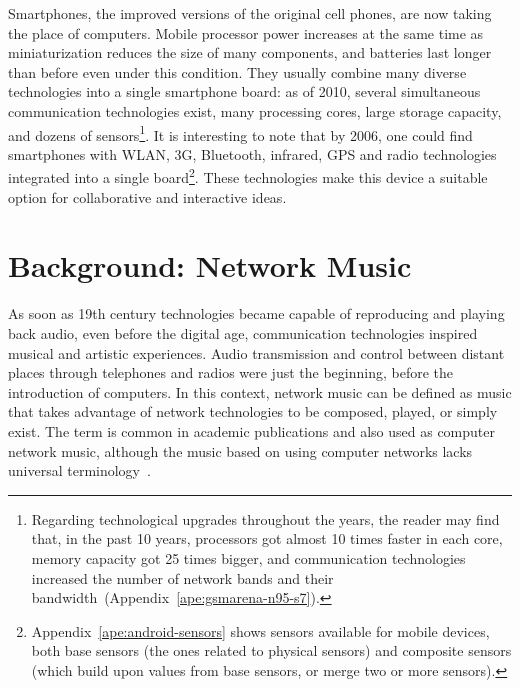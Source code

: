 Smartphones, the improved versions of the original cell phones, are now taking the place of computers.
Mobile processor power increases at the same time as miniaturization reduces the size of many components, and batteries last longer than before even under this condition.
They usually combine many diverse technologies into a single smartphone board: as of 2010, several simultaneous communication technologies exist, many processing cores, large storage capacity, and dozens of sensors\footnote{
	Regarding technological upgrades throughout the years, the reader may find that, in the past 10 years, processors got almost 10 times faster in each core, memory capacity got 25 times bigger, and communication technologies increased the number of network bands and their bandwidth~(Appendix~\ref{ape:gsmarena-n95-s7}).}.
It is interesting to note that by 2006, one could find smartphones with WLAN, 3G, Bluetooth, infrared, GPS and radio technologies integrated into a single board\footnote{
	Appendix~\ref{ape:android-sensors} shows sensors available for mobile devices, both base sensors (the ones related to physical sensors) and composite sensors (which build upon values from base sensors, or merge two or more sensors).}.
These technologies make this device a suitable option for collaborative and interactive ideas.

\section{Background: Network Music}
\label{sec:networkmusic}

As soon as 19th century technologies became capable of reproducing and playing back audio, even before the digital age, communication technologies inspired musical and artistic experiences.
Audio transmission and control between distant places through telephones and radios were just the beginning, before the introduction of computers.
In this context, network music can be defined as music that takes advantage of network technologies to be composed, played, or simply exist.
The term is common in academic publications and also used as computer network music, although the music based on using computer networks lacks universal terminology~\citep{Akkermann2014computer}.

